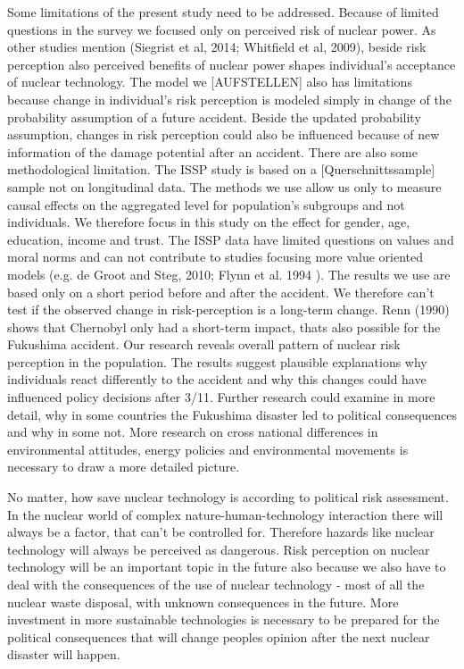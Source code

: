 {Some limitations of the present study need to be addressed. Because of limited questions in the survey  we focused only on perceived risk of nuclear power. As other studies mention (Siegrist et al, 2014; Whitfield et al, 2009), beside risk perception also perceived benefits of nuclear power shapes individual's acceptance of nuclear technology. The model we [AUFSTELLEN] also has limitations because  change in individual's risk perception is modeled simply in change of the probability assumption of a future accident. Beside the updated probability assumption, changes in risk perception could also be influenced because of new information of the damage potential after an accident. There are also some methodological limitation.  The ISSP study is based on a [Querschnittssample] sample not on longitudinal data. The methods we use allow us only to measure causal effects on the aggregated level for population's subgroups and not individuals. We therefore focus in this study on the effect for gender, age, education, income and trust. The ISSP data have limited questions on values and moral norms and can not contribute to studies focusing more value oriented models (e.g. de Groot and Steg, 2010; Flynn et al. 1994  \citep{deGroot:2010ez}). The results we use are based only on a short period before and after the accident. We therefore can't test if the observed change in risk-perception is a long-term change. Renn (1990) shows that Chernobyl only had a short-term impact, thats also possible for the Fukushima accident. Our research reveals overall pattern of nuclear risk perception in the population. The results suggest plausible explanations why individuals react differently to the accident and why this changes could have influenced policy decisions after 3/11.  Further research could examine in more detail, why in some countries the Fukushima disaster led to political consequences and why in some not. More research on cross national differences in environmental attitudes, energy policies and environmental movements is necessary to draw a more detailed picture. 
             

No matter, how save nuclear technology is according to political risk assessment. In the nuclear world of complex nature-human-technology interaction there will always be a factor, that can't be controlled for. Therefore hazards like nuclear technology will always be perceived as dangerous. Risk perception on nuclear technology will be an important topic in the future also because we also have to deal with the consequences of the use of nuclear technology - most of all the nuclear waste disposal, with unknown consequences in the future. More investment in more sustainable technologies is necessary to be prepared for the political consequences that will change peoples opinion after the next nuclear disaster will happen. 
 
}
